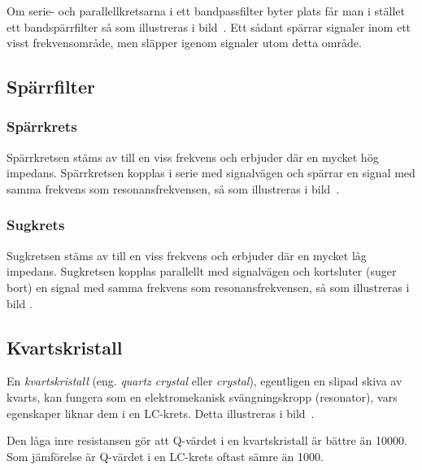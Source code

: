 Om serie- och parallellkretsarna i ett bandpassfilter byter plats får man
i stället ett bandspärrfilter så som illustreras i bild~.
Ett sådant spärrar signaler inom ett visst frekvensområde, men släpper igenom
signaler utom detta område.

\newpage
\subsection{Spärrfilter}


\subsubsection{Spärrkrets}
Spärrkretsen stäms av till en viss frekvens och erbjuder där en mycket hög
impedans.
Spärrkretsen kopplas i serie med signalvägen och spärrar en signal med samma
frekvens som resonansfrekvensen, så som illustreras i bild~.

\subsubsection{Sugkrets}
Sugkretsen stäms av till en viss frekvens och erbjuder där en mycket låg
impedans.
Sugkretsen kopplas parallellt med signalvägen och kortsluter (suger bort) en
signal med samma frekvens som resonansfrekvensen, så som illustreras i bild
.


\subsection{Kvartskristall}



En \emph{kvartskristall} (eng. \emph{quartz crystal} eller \emph{crystal}),
egentligen en slipad skiva av kvarts, kan fungera som en
elektromekanisk svängningskropp (resonator), vars egenskaper liknar dem i en
LC-krets.
Detta illustreras i bild~.

Den låga inre resistansen gör att Q-värdet i en kvartskristall är bättre än
10000.
Som jämförelse är Q-värdet i en LC-krets oftast sämre än 1000.

